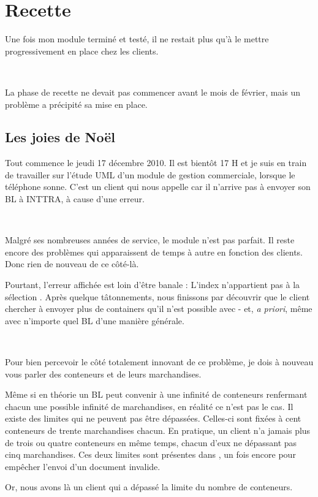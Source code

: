 \chapter{Recette}
Une fois mon module terminé et testé, il ne restait plus qu'à le mettre progressivement en place chez les clients.

~

La phase de recette ne devait pas commencer avant le mois de février, mais un problème a précipité sa mise en place.


\section{Les joies de Noël}
Tout commence le jeudi 17 décembre 2010. Il est bientôt 17 H et je suis en train de travailler sur l'étude UML d'un module de gestion commerciale, lorsque le téléphone sonne. C'est un client qui nous appelle car il n'arrive pas à envoyer son BL à INTTRA, à cause d'une erreur.

~

Malgré ses nombreuses années de service, le module \pireus{} n'est pas parfait. Il reste encore des problèmes qui apparaissent de temps à autre en fonction des clients. Donc rien de nouveau de ce côté-là.

Pourtant, l'erreur affichée est loin d'être banale : \og L'index n'appartient pas à la sélection \fg. Après quelque tâtonnements, nous finissons par découvrir que le client chercher à envoyer plus de containers qu'il n'est possible avec \pireus{} - et, \emph{a priori}, même avec n'importe quel BL d'une manière générale.

~

Pour bien percevoir le côté totalement \og innovant \fg{} de ce problème, je dois à nouveau vous parler des conteneurs et de leurs marchandises.

Même si en théorie un BL peut convenir à une infinité de conteneurs renfermant chacun une possible infinité de marchandises, en réalité ce n'est pas le cas. Il existe des limites qui ne peuvent pas être dépassées. Celles-ci sont fixées à cent conteneurs de trente marchandises chacun. En pratique, un client n'a jamais plus de trois ou quatre conteneurs en même temps, chacun d'eux ne dépassant pas cinq marchandises. Ces deux limites sont présentes dans \pireus, un fois encore pour empêcher l'envoi d'un document invalide.

Or, nous avons là un client qui a dépassé la limite du nombre de conteneurs.

